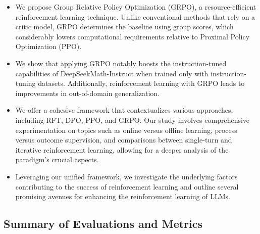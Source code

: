 \begin{itemize}[topsep=0pt]
    \item We propose Group Relative Policy Optimization (GRPO), a resource-efficient reinforcement learning technique. Unlike conventional methods that rely on a critic model, GRPO determines the baseline using group scores, which considerably lowers computational requirements relative to Proximal Policy Optimization (PPO).
    \item We show that applying GRPO notably boosts the instruction-tuned capabilities of DeepSeekMath-Instruct when trained only with instruction-tuning datasets. Additionally, reinforcement learning with GRPO leads to improvements in out-of-domain generalization.
    \item We offer a cohesive framework that contextualizes various approaches, including RFT, DPO, PPO, and GRPO. Our study involves comprehensive experimentation on topics such as online versus offline learning, process versus outcome supervision, and comparisons between single-turn and iterative reinforcement learning, allowing for a deeper analysis of the paradigm’s crucial aspects.
    \item Leveraging our unified framework, we investigate the underlying factors contributing to the success of reinforcement learning and outline several promising avenues for enhancing the reinforcement learning of LLMs.
\end{itemize}

\subsection{Summary of Evaluations and Metrics}

